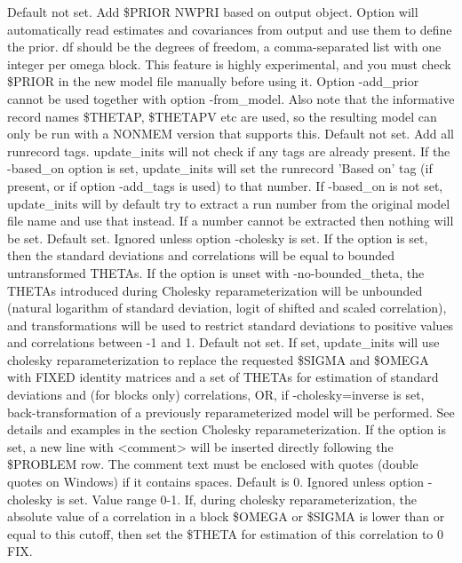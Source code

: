 \begin{optionlist}
Default not set. Add \$PRIOR NWPRI based on output object. Option will automatically read estimates and covariances from output and use them to define the prior. df should be the degrees of freedom, a comma-separated list with one integer per omega block. This feature is highly experimental, and you must check \$PRIOR in the new model file manually before using it. Option -add\_prior cannot be used together with option -from\_model. Also note that the informative record names \$THETAP, \$THETAPV etc are used,
so the resulting model can only be run with a NONMEM version that supports this.
\nextopt
{}
Default not set. Add all runrecord tags. update\_inits will not check if any tags are already present.
\nextopt
{}
If the -based\_on option is set, update\_inits will set the runrecord 'Based on' tag (if present, or if option -add\_tags is used) 
to that number. If -based\_on is not set, update\_inits will by default try to extract a run number from the original model file name and use that instead. If a number cannot be extracted then nothing will be set. 
\nextopt	
{}
Default set. Ignored unless option -cholesky is set. If the option is set, then the standard deviations and correlations will be equal to bounded untransformed THETAs. If the option is unset with -no-bounded\_theta, the THETAs introduced during Cholesky reparameterization will be unbounded (natural logarithm of standard deviation, logit of shifted and scaled correlation), and transformations will be used to restrict standard deviations to positive values and correlations between -1 and 1.
\nextopt
{}
Default not set. If set, update\_inits will use cholesky reparameterization to replace the requested \$SIGMA and \$OMEGA with FIXED identity matrices and a set of THETAs for estimation of standard deviations and (for blocks only) correlations, OR, if -cholesky=inverse is set, back-transformation of a previously reparameterized model will be performed. See details and examples in the section Cholesky reparameterization.
\nextopt
{}
If the option is set, a new line with <comment> will be inserted directly following the \$PROBLEM row. The comment text must be enclosed with quotes (double quotes on Windows) if it contains spaces.
\nextopt
{}
Default is 0. Ignored unless option -cholesky is set. Value range 0-1. If, during cholesky reparameterization, the absolute value of a correlation in a block \$OMEGA or \$SIGMA is lower than or equal to this cutoff, then set the \$THETA for estimation of this correlation to 0 FIX.

\end{optionlist}

